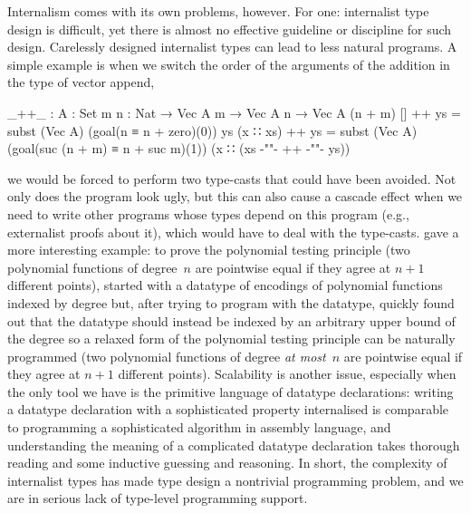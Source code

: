 Internalism comes with its own problems, however.
For one: internalist type design is difficult, yet there is almost no effective guideline or discipline for such design.
Carelessly designed internalist types can lead to less natural programs.
A simple example is when we switch the order of the arguments of the addition in the type of vector append,
\begin{code}
_++_ : {A : Set} {m n : Nat} → Vec A m → Vec A n → Vec A (n + m)
[]        ++ ys = subst (Vec A) (goal(n ≡ n + zero)(0)) ys
(x ∷ xs)  ++ ys = subst (Vec A) (goal(suc (n + m) ≡ n + suc m)(1)) (x ∷ (xs {-"\kern-1pt"-} ++ {-"\kern-1pt"-} ys))
\end{code}
we would be forced to perform two type-casts that could have been avoided.
Not only does the program look ugly, but this can also cause a cascade effect when we need to write other programs whose types depend on this program (e.g., externalist proofs about it), which would have to deal with the type-casts.
\citet{McBride-polynomial-testing} gave a more interesting example: to prove the polynomial testing principle (two polynomial functions of degree~$n$ are pointwise equal if they agree at $n + 1$ different points), \citeauthor{McBride-polynomial-testing} started with a datatype of encodings of polynomial functions indexed by degree but, after trying to program with the datatype, quickly found out that the datatype should instead be indexed by an arbitrary upper bound of the degree so a relaxed form of the polynomial testing principle can be naturally programmed (two polynomial functions of degree \emph{at most}~$n$ are pointwise equal if they agree at $n + 1$ different points).
Scalability is another issue, especially when the only tool we have is the primitive language of datatype declarations: writing a datatype declaration with a sophisticated property internalised is comparable to programming a sophisticated algorithm in assembly language, and understanding the meaning of a complicated datatype declaration takes thorough reading and some inductive guessing and reasoning.
In short, the complexity of internalist types has made type design a nontrivial programming problem, and we are in serious lack of type-level programming support.


